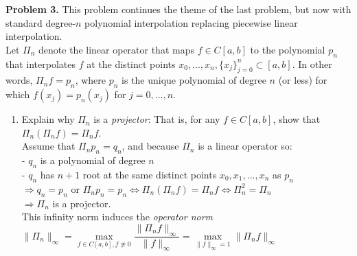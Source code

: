 \documentclass[14pt,a4paper]{article}
\begin{document}
\label{Problem 3}
\large\textbf{Problem 3.} This problem continues the theme of the last problem, but now with standard degree-$n$ polynomial interpolation replacing piecewise linear interpolation.\\
Let $\Pi_n$ denote the linear operator that maps $f \in C[a,b]$ to the polynomial $p_n$ that interpolates $f$ at the distinct points $x_0, ..., x_n, \{x_j\}_{j=0}^n \subset [a,b]$. In other words, $\Pi_nf = p_n$, where $p_n$ is the unique polynomial of degree $n$ (or less) for which $f(x_j) = p_n(x_j)$ for $ j = 0, ..., n$.
\begin{enumerate}
	\label{3a}
	\item Explain why $\Pi_n$ is a \textit{projector}: That is, for any $f \in C[a,b]$, show that $\Pi_n(\Pi_nf) = \Pi_nf$.\\
	Assume that $\Pi_np_n = q_n$, and because $\Pi_n$ is a linear operator so: \\
	- $q_n$ is a polynomial of degree $n$ \\
	- $q_n$ has $n+1$ root at the same distinct points $x_0,x_1, ...,x_n$ as $p_n$\\
	$\Rightarrow q_n = p_n$ or $\Pi_np_n = p_n \Leftrightarrow \Pi_n(\Pi_nf) = \Pi_nf \Leftrightarrow \Pi_n^2 = \Pi_n$ \\
	$\Rightarrow \Pi_n$ is a projector.\\
	
	 This infinity norm induces the \textit{operator norm}\\
	\hspace*{4cm} $ \|\Pi_n\|_{\infty} = \max\limits_{f \in C[a,b], f \not\equiv 0} \dfrac{\|\Pi_nf\|_{\infty}}{\|f\|_{\infty}} = \max\limits_{\|f\|_{\infty} =1} \|\Pi_nf\|_{\infty}$
	

\end{enumerate}
\end{document}
